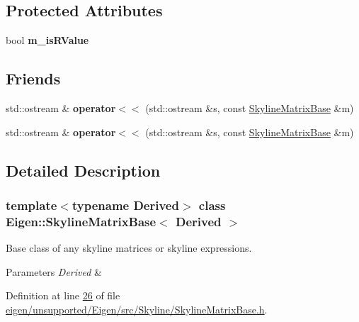 \subsection*{Protected Attributes}
\begin{DoxyCompactItemize}
\item 
\mbox{\label{class_eigen_1_1_skyline_matrix_base_ab20fd6fdb5fb787ea958689d03dffa88}} 
bool {\bfseries m\+\_\+is\+R\+Value}
\end{DoxyCompactItemize}
\subsection*{Friends}
\begin{DoxyCompactItemize}
\item 
\mbox{\label{class_eigen_1_1_skyline_matrix_base_ae0f725fdd39f176d58f2366f4565e91a}} 
std\+::ostream \& {\bfseries operator$<$$<$} (std\+::ostream \&s, const \hyperlink{class_eigen_1_1_skyline_matrix_base}{Skyline\+Matrix\+Base} \&m)
\item 
\mbox{\label{class_eigen_1_1_skyline_matrix_base_ae0f725fdd39f176d58f2366f4565e91a}} 
std\+::ostream \& {\bfseries operator$<$$<$} (std\+::ostream \&s, const \hyperlink{class_eigen_1_1_skyline_matrix_base}{Skyline\+Matrix\+Base} \&m)
\end{DoxyCompactItemize}


\subsection{Detailed Description}
\subsubsection*{template$<$typename Derived$>$\newline
class Eigen\+::\+Skyline\+Matrix\+Base$<$ Derived $>$}

Base class of any skyline matrices or skyline expressions. 


\begin{DoxyParams}{Parameters}
{\em Derived} & \\
\hline
\end{DoxyParams}


Definition at line \hyperlink{eigen_2unsupported_2_eigen_2src_2_skyline_2_skyline_matrix_base_8h_source_l00026}{26} of file \hyperlink{eigen_2unsupported_2_eigen_2src_2_skyline_2_skyline_matrix_base_8h_source}{eigen/unsupported/\+Eigen/src/\+Skyline/\+Skyline\+Matrix\+Base.\+h}.




